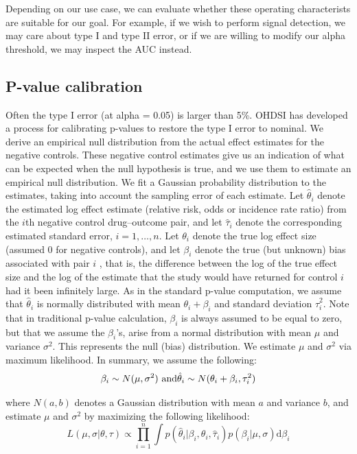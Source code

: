 \documentclass[]{book}
\begin{document}
Depending on our use case, we can evaluate whether these operating
characterists are suitable for our goal. For example, if we wish to
perform signal detection, we may care about type I and type II error, or
if we are willing to modify our alpha threshold, we may inspect the AUC
instead.

\subsection{P-value calibration}\label{p-value-calibration}

Often the type I error (at alpha = 0.05) is larger than 5\%. OHDSI has
developed a process for calibrating p-values to restore the type I error
to nominal. \citep{schuemie_2014} We derive an empirical null
distribution from the actual effect estimates for the negative controls.
These negative control estimates give us an indication of what can be
expected when the null hypothesis is true, and we use them to estimate
an empirical null distribution. We fit a Gaussian probability
distribution to the estimates, taking into account the sampling error of
each estimate. Let \(\hat{\theta}_i\) denote the estimated log effect
estimate (relative risk, odds or incidence rate ratio) from the \(i\)th
negative control drug--outcome pair, and let \(\hat{\tau}_i\) denote the
corresponding estimated standard error, \(i=1,\ldots,n\). Let
\(\theta_i\) denote the true log effect size (assumed 0 for negative
controls), and let \(\beta_i\) denote the true (but unknown) bias
associated with pair \(i\) , that is, the difference between the log of
the true effect size and the log of the estimate that the study would
have returned for control \(i\) had it been infinitely large. As in the
standard p-value computation, we assume that \(\hat{\theta}_i\) is
normally distributed with mean \(\theta_i + \beta_i\) and standard
deviation \(\hat{\tau}_i^2\). Note that in traditional p-value
calculation, \(\beta_i\) is always assumed to be equal to zero, but that
we assume the \(\beta_i\)'s, arise from a normal distribution with mean
\(\mu\) and variance \(\sigma^2\). This represents the null (bias)
distribution. We estimate \(\mu\) and \(\sigma^2\) via maximum
likelihood. In summary, we assume the following:
\[\beta_i \sim N(\mu,\sigma^2) \text{  and} \\ \hat{\theta}_i \sim N(\theta_i + \beta_i, \tau_i^2)\]

where \(N(a,b)\) denotes a Gaussian distribution with mean \(a\) and
variance \(b\), and estimate \(\mu\) and \(\sigma^2\) by maximizing the
following likelihood:
\[L(\mu, \sigma | \theta, \tau) \propto \prod_{i=1}^{n}\int p(\hat{\theta}_i|\beta_i, \theta_i, \hat{\tau}_i)p(\beta_i|\mu, \sigma) \text{d}\beta_i\]
\end{document}
